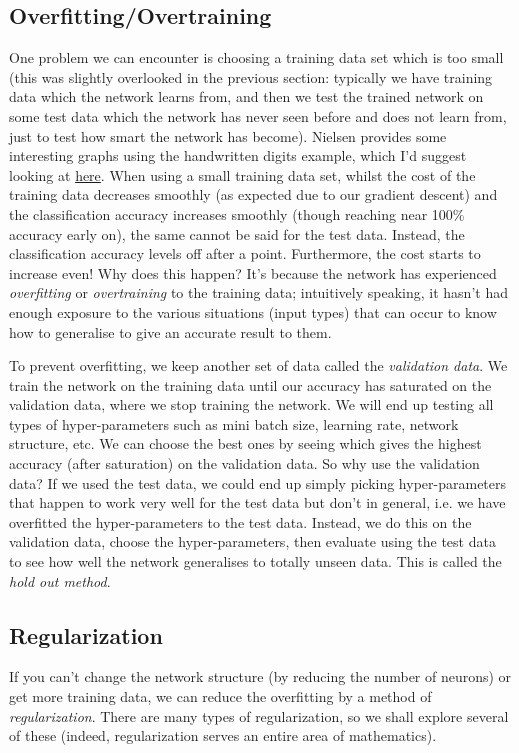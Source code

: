 \documentclass[10pt]{article}
\begin{document}
\subsection{Overfitting/Overtraining}
One problem we can encounter is choosing a training data set which is too small (this was slightly overlooked in the previous section: typically we have training data which the network learns from, and then we test the trained network on some test data which the network has never seen before and does not learn from, just to test how smart the network has become). Nielsen provides some interesting graphs using the handwritten digits example, which I'd suggest looking at \href{http://neuralnetworksanddeeplearning.com/chap3.html}{here}. When using a small training data set, whilst the cost of the training data decreases smoothly (as expected due to our gradient descent) and the classification accuracy increases smoothly (though reaching near 100$\%$ accuracy early on), the same cannot be said for the test data. Instead, the classification accuracy levels off after a point. Furthermore, the cost starts to increase even! Why does this happen? It's because the network has experienced \textit{overfitting} or \textit{overtraining} to the training data; intuitively speaking, it hasn't had enough exposure to the various situations (input types) that can occur to know how to generalise to give an accurate result to them. \par
To prevent overfitting, we keep another set of data called the \textit{validation data}. We train the network on the training data until our accuracy has saturated on the validation data, where we stop training the network. We will end up testing all types of hyper-parameters such as mini batch size, learning rate, network structure, etc. We can choose the best ones by seeing which gives the highest accuracy (after saturation) on the validation data. So why use the validation data? If we used the test data, we could end up simply picking hyper-parameters that happen to work very well for the test data but don't in general, i.e. we have overfitted the hyper-parameters to the test data. Instead, we do this on the validation data, choose the hyper-parameters, then evaluate using the test data to see how well the network generalises to totally unseen data. This is called the \textit{hold out method}.

\subsection{Regularization}
If you can't change the network structure (by reducing the number of neurons) or get more training data, we can reduce the overfitting by a method of \textit{regularization}. There are many types of regularization, so we shall explore several of these (indeed, regularization serves an entire area of mathematics). 
\end{document}
